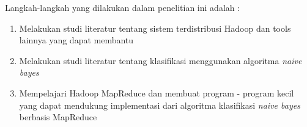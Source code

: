 Langkah-langkah yang dilakukan dalam penelitian ini adalah :
\begin{enumerate}
	\item Melakukan studi literatur tentang sistem terdistribusi Hadoop dan tools lainnya yang dapat membantu
		\item Melakukan studi literatur tentang klasifikasi menggunakan algoritma \textit{naive bayes}
		\item Mempelajari Hadoop MapReduce dan membuat program - program kecil yang dapat mendukung implementasi dari algoritma klasifikasi \textit{naive bayes} berbasis MapReduce

\end{enumerate}

